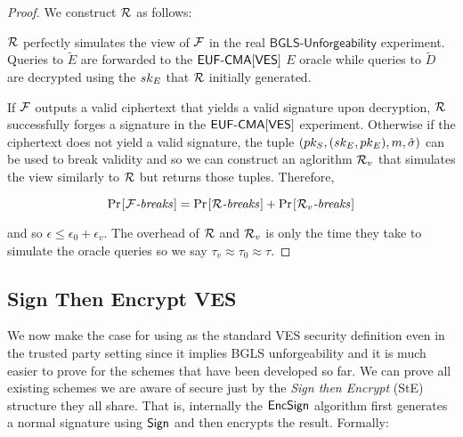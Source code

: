 \begin{proof}
  We construct $\mathcal{R}$ as follows:

\begin{center}
\end{center}


$\mathcal{R}$ perfectly simulates the view of $\mathcal{F}$ in the real $\textsf{BGLS-Unforgeability}$ experiment.
Queries to $\tilde{E}$ are forwarded to the $\textsf{EUF-CMA}[\textsf{VES}]$ $E$ oracle while queries to $\tilde{D}$ are decrypted using the $sk_E$ that $\mathcal{R}$ initially generated.

If $\mathcal{F}$ outputs a valid ciphertext that yields a valid signature upon decryption, $\mathcal{R}$ successfully forges a signature in the $\textsf{EUF-CMA}[\textsf{VES}]$ experiment.
Otherwise if the ciphertext does not yield a valid signature, the tuple $(pk_S,(sk_E, pk_E),m, \hat{\sigma})$ can be used to break validity and so we can construct an aglorithm $\mathcal{R}_v$ that simulates the view similarly to $\mathcal{R}$ but returns those tuples. Therefore,

\[  \prob{\textit{$\F$-breaks}} = \prob{\textit{$\R$-breaks}} + \prob{\textit{$\R_v$-breaks}} \]

and so $\epsilon \leq \epsilon_0 + \epsilon_v$.
The overhead of $\mathcal{R}$ and $\mathcal{R}_v$ is only the time they take to simulate the oracle queries so we say $\tau_v \approx \tau_0 \approx \tau$.
\end{proof}


\subsection{Sign Then Encrypt VES}

We now make the case for using \EUFCMAVES as the standard VES security definition even in the trusted party setting since it implies BGLS unforgeability and it is much easier to prove for the schemes that have been developed so far.
We can prove all existing schemes we are aware of \cite{Boneh:2003:AVE:1766171.1766207, Ruckert:2009:SVE:1615384.1615387, waters-ves, SHAO20081961, VES-structure-preserving} \EUFCMAVES secure just by the \emph{Sign then Encrypt} (StE) structure they all share.
That is, internally the $\textsf{EncSign}$ algorithm first generates a normal signature using $\textsf{Sign}$ and then encrypts the result. Formally:

